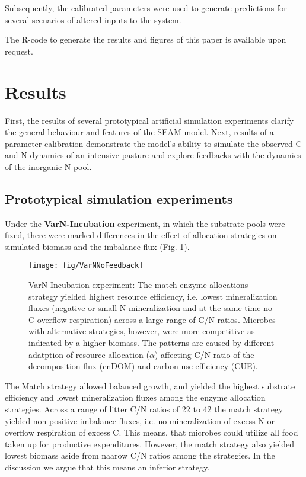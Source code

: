 Subsequently, the calibrated parameters were used to generate
predictions for several scenarios of altered inputs to the system.

The R-code to generate the results and figures of this paper is available upon
request. 
 

\section{Results}

First, the results of several prototypical artificial simulation experiments
clarify the general behaviour and features of the SEAM model. Next, results of a
parameter calibration demonstrate the model's ability to
simulate the observed C and N dynamics of an intensive pasture and explore
feedbacks with the dynamics of the inorganic N pool.

\subsection{Prototypical simulation experiments}
\label{sec:ResultsProto}

Under the \textbf{VarN-Incubation} experiment, in which the substrate pools were fixed,
there were marked differences in the effect of allocation strategies on simulated biomass and the imbalance flux (Fig.
\ref{fig:VarNNoFeedback}).
 
\begin{figure}[t] \vspace*{2mm}
\begin{center}
\texttt{[image: fig/VarNNoFeedback]}
\end{center}
\caption{
VarN-Incubation experiment: The match enzyme allocations strategy yielded
highest resource efficiency, i.e. lowest mineralization fluxes (negative or
small N mineralization and at the same time no C overflow respiration) across a
large range of C/N ratios.
Microbes with alternative strategies, however, were more competitive as
indicated by a higher biomass. The patterns are caused by different adatption of
resource allocation ($\alpha$) affecting C/N ratio of the decomposition flux
(cnDOM) and carbon use efficiency (CUE).
\label{fig:VarNNoFeedback}} 
\end{figure}

The Match strategy allowed balanced growth, and yielded the highest substrate
efficiency and lowest mineralization fluxes among the enzyme allocation
strategies. Across a range of litter C/N ratios of 22 to 42 the match strategy
yielded non-positive imbalance fluxes, i.e. no mineralization of excess N or
overflow respiration of excess C. This means, that microbes could utilize all
food taken up for productive expenditures. However, the match strategy also
yielded lowest biomass aside from naarow C/N ratios among the strategies. In the
discussion we argue that this means an inferior strategy.

